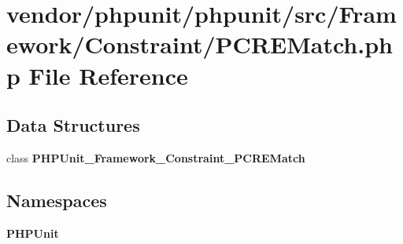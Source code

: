 \section{vendor/phpunit/phpunit/src/\+Framework/\+Constraint/\+P\+C\+R\+E\+Match.php File Reference}
\label{_p_c_r_e_match_8php}
\subsection*{Data Structures}
\begin{DoxyCompactItemize}
\item 
class {\bf P\+H\+P\+Unit\+\_\+\+Framework\+\_\+\+Constraint\+\_\+\+P\+C\+R\+E\+Match}
\end{DoxyCompactItemize}
\subsection*{Namespaces}
\begin{DoxyCompactItemize}
\item 
 {\bf P\+H\+P\+Unit}
\end{DoxyCompactItemize}
